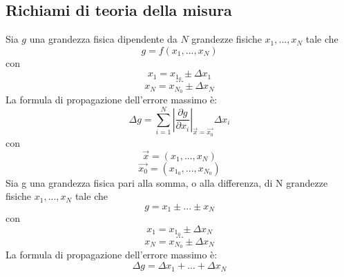 \subsection{Richiami di teoria della misura}
Sia $g$ una grandezza fisica dipendente da $N$ grandezze fisiche $x_1,...,x_N$ tale che
\begin{equation}
	g=f(x_1,...,x_N)
\end{equation}
con
\begin{equation}
	x_1 = x_{1_0}\pm \Delta x_1
\end{equation}
$$ ... $$
\begin{equation}
	x_N = x_{N_0}\pm \Delta x_N
\end{equation}
La formula di propagazione dell'errore massimo è:
\begin{equation}
	\Delta g=\displaystyle\sum_{i=1}^{N}\left|\frac{\partial g}{\partial x_i}\right|_{\vec{x}=\vec{x_0}}\Delta x_i
\end{equation}
con
\begin{equation}
	\vec{x}=(x_1,...,x_N)
\end{equation}
\begin{equation}
	\vec{x_0}=(x_{1_0},...,x_{N_0})
\end{equation}
Sia g una grandezza fisica pari alla somma, o alla differenza, di N grandezze fisiche $x_1,...,x_N$ tale che
\begin{equation}
	g=x_1\pm...\pm x_N
\end{equation}
con
\begin{equation}
	x_1=x_{1_0}\pm \Delta x_N
\end{equation}
$$ ... $$
\begin{equation}
	x_N=x_{N_0}\pm \Delta x_N
\end{equation}
La formula di propagazione dell'errore massimo è:
\begin{equation}
	\Delta g= \Delta x_1+...+\Delta x_N
\end{equation}

